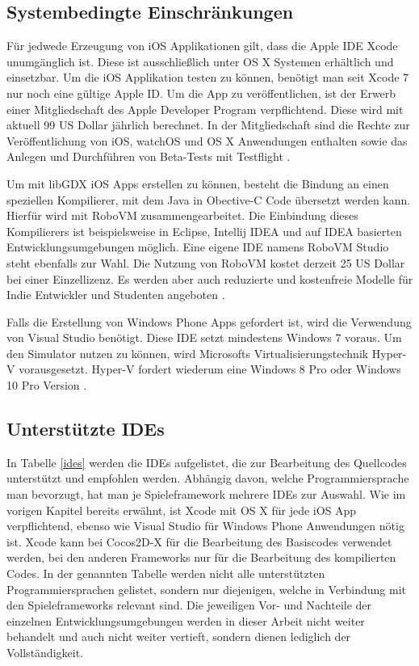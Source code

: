 \subsection{Systembedingte Einschränkungen}
Für jedwede Erzeugung von iOS Applikationen gilt, dass die Apple IDE Xcode unumgänglich ist. Diese ist ausschließlich unter OS X Systemen erhältlich und einsetzbar. Um die iOS Applikation testen zu können, benötigt man seit Xcode 7 nur noch eine gültige Apple ID. Um die App zu veröffentlichen, ist der Erwerb einer Mitgliedschaft des Apple Developer Program verpflichtend. Diese wird mit aktuell 99 US Dollar jährlich berechnet. In der Mitgliedschaft sind die Rechte zur Veröffentlichung von iOS, watchOS und OS X Anwendungen enthalten sowie das Anlegen und Durchführen von Beta-Tests mit Testflight \citep{apple_developer_program}.

\bigskip
Um mit libGDX iOS Apps erstellen zu können, besteht die Bindung an einen speziellen Kompilierer, mit dem Java in Obective-C Code übersetzt werden kann. Hierfür wird mit RoboVM zusammengearbeitet. Die Einbindung dieses Kompilierers ist beispielsweise in Eclipse, Intellij IDEA und auf IDEA basierten Entwicklungsumgebungen möglich. Eine eigene IDE namens RoboVM Studio steht ebenfalls zur Wahl. Die Nutzung von RoboVM kostet derzeit 25 US Dollar bei einer Einzellizenz. Es werden aber auch reduzierte und kostenfreie Modelle für Indie Entwickler und Studenten angeboten \citep{roboVM}. 

\bigskip
Falls die Erstellung von Windows Phone Apps gefordert ist, wird die Verwendung von Visual Studio benötigt. Diese IDE setzt mindestens Windows 7 voraus. Um den Simulator nutzen zu können, wird Microsofts Virtualisierungstechnik Hyper-V vorausgesetzt. Hyper-V fordert wiederum  eine Windows 8 Pro oder Windows 10 Pro Version \citep{visual_studio}. 

\subsection{Unterstützte IDEs}
In Tabelle \ref{ides} werden die IDEs aufgelistet, die zur Bearbeitung des Quellcodes unterstützt und empfohlen werden. Abhängig davon, welche Programmiersprache man bevorzugt, hat man je Spieleframework mehrere IDEs zur Auswahl. Wie im vorigen Kapitel bereits erwähnt, ist Xcode mit OS X für jede iOS App verpflichtend, ebenso wie Visual Studio für Windows Phone Anwendungen nötig ist. Xcode kann bei Cocos2D-X für die Bearbeitung des Basiscodes verwendet werden, bei den anderen Frameworks nur für die Bearbeitung des kompilierten Codes. In der genannten Tabelle werden nicht alle unterstützten Programmiersprachen gelistet, sondern nur diejenigen, welche in Verbindung mit den Spieleframeworks relevant sind. Die jeweiligen Vor- und Nachteile der einzelnen Entwicklungsumgebungen werden in dieser Arbeit nicht weiter behandelt und auch nicht weiter vertieft, sondern dienen lediglich der Vollständigkeit.

